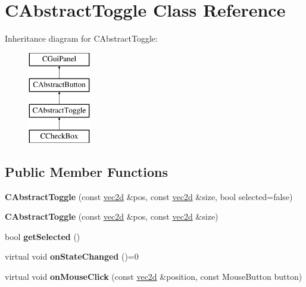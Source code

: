 \hypertarget{class_c_abstract_toggle}{
\section{CAbstractToggle Class Reference}
\label{class_c_abstract_toggle}
}
Inheritance diagram for CAbstractToggle:\begin{figure}[H]
\begin{center}
\leavevmode
\includegraphics[height=4.000000cm]{class_c_abstract_toggle}
\end{center}
\end{figure}
\subsection*{Public Member Functions}
\begin{DoxyCompactItemize}
\item 
\hypertarget{class_c_abstract_toggle_a57b1c9d62c8cc6e53b483afb2d329b16}{
{\bfseries CAbstractToggle} (const \hyperlink{classvec2d}{vec2d} \&pos, const \hyperlink{classvec2d}{vec2d} \&size, bool selected=false)}
\label{class_c_abstract_toggle_a57b1c9d62c8cc6e53b483afb2d329b16}

\item 
\hypertarget{class_c_abstract_toggle_a0cef5f815d59738647bf1d3ae130ee75}{
{\bfseries CAbstractToggle} (const \hyperlink{classvec2d}{vec2d} \&pos, const \hyperlink{classvec2d}{vec2d} \&size)}
\label{class_c_abstract_toggle_a0cef5f815d59738647bf1d3ae130ee75}

\item 
\hypertarget{class_c_abstract_toggle_ad96f8f6e17fdbb72e2c76358496f395e}{
bool {\bfseries getSelected} ()}
\label{class_c_abstract_toggle_ad96f8f6e17fdbb72e2c76358496f395e}

\item 
\hypertarget{class_c_abstract_toggle_adf89a794ba7ad5af46d6a65adadcb727}{
virtual void {\bfseries onStateChanged} ()=0}
\label{class_c_abstract_toggle_adf89a794ba7ad5af46d6a65adadcb727}

\item 
\hypertarget{class_c_abstract_toggle_a43c338306fc3661aa217716047b424ad}{
virtual void {\bfseries onMouseClick} (const \hyperlink{classvec2d}{vec2d} \&position, const MouseButton button)}
\label{class_c_abstract_toggle_a43c338306fc3661aa217716047b424ad}

\end{DoxyCompactItemize}
